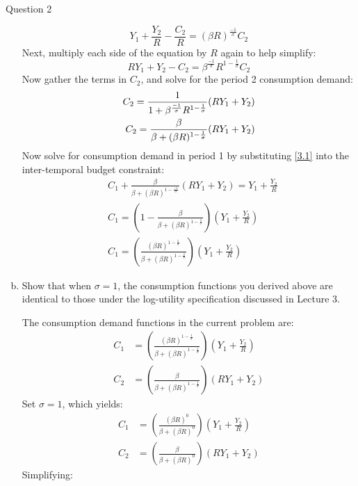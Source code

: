 \documentclass[a4paper]{article}
\newif\IfInSansMode
\begin{document}
\begin{questionbox}{Question 2}
\begin{enumerate}[(a)]
\begin{explanationbox}
				\[
					Y_1 + \frac{Y_2}{R} - \frac{C_2}{R} = (\beta R)^{\frac{-1}{\sigma}} C_2
				\]
				Next, multiply each side of the equation by \( R \) again to help simplify:
				\[
					R Y_1 + Y_2 - C_2 = \beta^{\frac{-1}{\sigma}} R^{1-\frac{1}{\sigma}} C_2
				\]
				Now gather the terms in \( C_2 \), and solve for the period 2 consumption demand:
				\begin{align}
					C_2 = \frac{1}{1 + \beta^{\frac{-1}{\sigma}}R^{1-\frac{1}{\sigma}}} (RY_1 + Y_2) \notag\\
					C_2 = \frac{\beta}{\beta + (\beta R)^{1 - \frac{1}{\sigma}}} (RY_1 + Y_2) \label{3.1}
				\end{align}
				Now solve for consumption demand in period 1 by substituting \cref{3.1} into the inter-temporal budget constraint:
				\begin{align*}
					&C_1 + \frac{\beta}{\beta + (\beta R)^{1 - \frac{-1}{\sigma}}} (RY_1 + Y_2) = Y_1 + \frac{Y_2}{R}\\
					&C_1 = \left( 1 - \frac{\beta}{\beta + (\beta R)^{1 - \frac{1}{\sigma}}} \right) \left( Y_1 +\frac{Y_2}{R} \right)\\
					&C_1 = \left( \frac{(\beta R)^{1 - \frac{1}{\sigma}}}{\beta + (\beta R)^{1 - \frac{1}{\sigma}}} \right) \left( Y_1 +\frac{Y_2}{R} \right)
				\end{align*}
			\end{explanationbox}
			\item Show that when \( \sigma = 1 \), the consumption functions you derived above are identical to those under the log-utility specification discussed in Lecture 3.
			\begin{explanationbox}
				The consumption demand functions in the current problem are:
				\begin{align*}
					C_1 &= \left( \frac{(\beta R)^{1 - \frac{1}{\sigma}}}{\beta + (\beta R)^{1 - \frac{1}{\sigma}}} \right) \left( Y_1 +\frac{Y_2}{R} \right)\\
					C_2 &= \left( \frac{\beta}{\beta + (\beta R)^{1 - \frac{1}{\sigma}}} \right) \left( RY_1 + Y_2 \right)
				\end{align*}
				Set \( \sigma = 1 \), which yields:
				\begin{align*}
					C_1 &= \left( \frac{(\beta R)^0}{\beta + (\beta R)^0} \right) \left( Y_1 +\frac{Y_2}{R} \right)\\
					C_2 &= \left( \frac{\beta}{\beta + (\beta R)^0} \right) \left( RY_1 + Y_2 \right)
				\end{align*}
				Simplifying:
				\begin{align*}

\end{align*}
\end{explanationbox}
\end{enumerate}
\end{questionbox}
\end{document}
